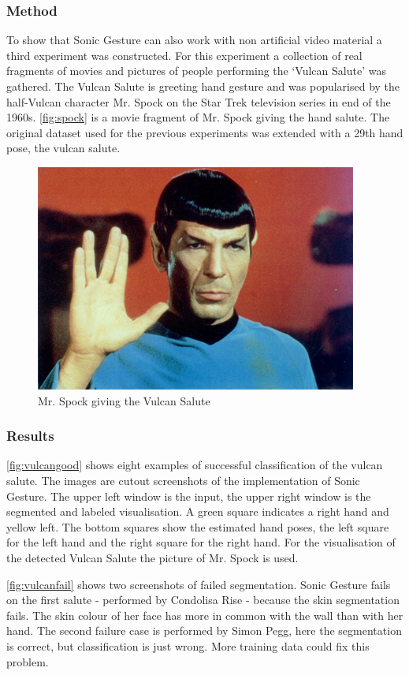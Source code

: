 \subsubsection{Method}
To show that Sonic Gesture can also work with non artificial video material a third experiment was constructed. For this experiment a collection of real fragments of movies and pictures of people performing the `Vulcan Salute' was gathered. The Vulcan Salute is greeting hand gesture and was popularised by the half-Vulcan character Mr. Spock on the Star Trek television series in end of the 1960s. \autoref{fig:spock} is a movie fragment of Mr. Spock giving the hand salute. The original dataset used for the previous experiments was extended with a 29th hand pose, the vulcan salute. 

\begin{figure}[tb]
\centering{}
\includegraphics[width=0.6\linewidth]{figures/spock/salute.png}
\caption{Mr. Spock giving the Vulcan Salute}
\label{fig:spock}
\end{figure}


\subsubsection{Results}
\autoref{fig:vulcangood} shows eight examples of successful classification of the vulcan salute. The images are cutout screenshots of the implementation of Sonic Gesture. The upper left window is the input, the upper right window is the segmented and labeled visualisation. A green square indicates a right hand and yellow left. The bottom squares show the estimated hand poses, the left square for the left hand and the right square for the right hand. For the visualisation of the detected Vulcan Salute the picture of Mr. Spock is used.

\autoref{fig:vulcanfail} shows two screenshots of failed segmentation. Sonic Gesture fails on the first salute - performed by Condolisa Rise - because the skin segmentation fails. The skin colour of her face has more in common with the wall than with her hand. The second failure case is performed by Simon Pegg, here the segmentation is correct, but classification is just wrong. More training data could fix this problem.

